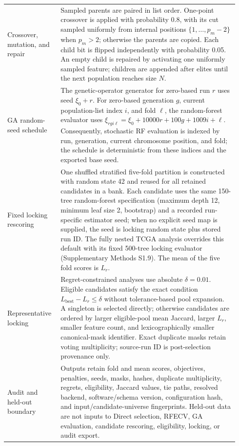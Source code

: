 {\begin{longtable}{@{}>{\raggedright\arraybackslash}p{0.205\linewidth}>{\raggedright\arraybackslash}p{0.735\linewidth}@{}}
Crossover, mutation, and repair & Sampled parents are paired in list order. One-point crossover is applied with probability 0.8, with its cut sampled uniformly from internal positions $\{1,\ldots,p_m-2\}$ when $p_m>2$; otherwise the parents are copied. Each child bit is flipped independently with probability 0.05. An empty child is repaired by activating one uniformly sampled feature; children are appended after elites until the next population reaches size $N$. \\
GA random-seed schedule & The genetic-operator generator for zero-based run $r$ uses seed $\xi_0+r$. For zero-based generation $g$, current population-list index $i$, and fold $\ell$, the random-forest evaluator uses $\xi_{rgi\ell}=\xi_0+10000r+100g+1009i+\ell$. Consequently, stochastic RF evaluation is indexed by run, generation, current chromosome position, and fold; the schedule is deterministic from these indices and the exported base seed. \\
Fixed locking rescoring & One shuffled stratified five-fold partition is constructed with random state 42 and reused for all retained candidates in a bank. Each candidate uses the same 150-tree random-forest specification (maximum depth 12, minimum leaf size 2, bootstrap) and a recorded run-specific estimator seed; when no explicit seed map is supplied, the seed is locking random state plus stored run ID. The fully nested TCGA analysis overrides this default with its fixed 500-tree locking evaluator (Supplementary Methods S1.9). The mean of the five fold scores is $L_r$. \\
Representative locking & Regret-constrained analyses use absolute $\delta=0.01$. Eligible candidates satisfy the exact condition $L_{\mathrm{best}}-L_r\leq\delta$ without tolerance-based pool expansion. A singleton is selected directly; otherwise candidates are ordered by larger eligible-pool mean Jaccard, larger $L_r$, smaller feature count, and lexicographically smaller canonical-mask identifier. Exact duplicate masks retain voting multiplicity; source-run ID is post-selection provenance only. \\
Audit and held-out boundary & Outputs retain fold and mean scores, objectives, penalties, seeds, masks, hashes, duplicate multiplicity, regrets, eligibility, Jaccard values, tie paths, resolved backend, software/schema version, configuration hash, and input/candidate-universe fingerprints. Held-out data are not inputs to Direct selection, RFECV, GA evaluation, candidate rescoring, eligibility, locking, or audit export. \\
\end{longtable}
}
